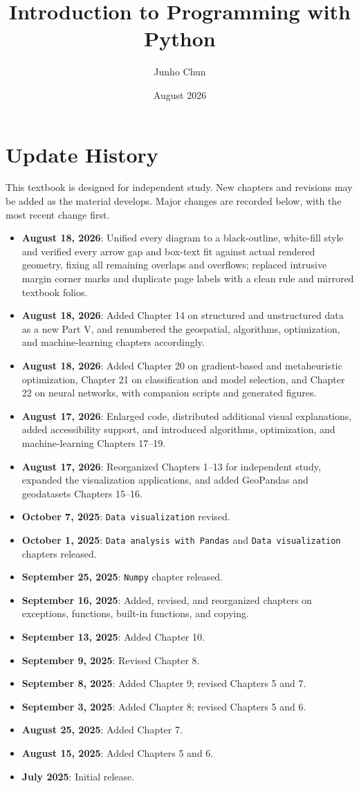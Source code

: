 \documentclass{textbook}
\title{Introduction to Programming with Python}
\author{Junho Chun}
\date{August 2026}
\begin{document}


\section{Update History}
This textbook is designed for independent study. New chapters and revisions
may be added as the material develops. Major changes are recorded below, with
the most recent change first.

\begin{itemize}
\item[] \textbf{August 18, 2026}: Unified every diagram to a black-outline, white-fill style and verified every arrow gap and box-text fit against actual rendered geometry, fixing all remaining overlaps and overflows; replaced intrusive margin corner marks and duplicate page labels with a clean rule and mirrored textbook folios.
\item[] \textbf{August 18, 2026}: Added Chapter 14 on structured and unstructured data as a new Part V, and renumbered the geospatial, algorithms, optimization, and machine-learning chapters accordingly.
\item[] \textbf{August 18, 2026}: Added Chapter 20 on gradient-based and metaheuristic optimization, Chapter 21 on classification and model selection, and Chapter 22 on neural networks, with companion scripts and generated figures.
\item[] \textbf{August 17, 2026}: Enlarged code, distributed additional visual explanations, added accessibility support, and introduced algorithms, optimization, and machine-learning Chapters 17--19.
\item[] \textbf{August 17, 2026}: Reorganized Chapters 1--13 for independent study, expanded the visualization applications, and added GeoPandas and geodatasets Chapters 15--16.
\item[] \textbf{October 7, 2025}: \texttt{Data visualization} revised.
\item[] \textbf{October 1, 2025}: \texttt{Data analysis with Pandas} and \texttt{Data visualization} chapters released.
\item[] \textbf{September 25, 2025}: \texttt{Numpy} chapter released.
\item[] \textbf{September 16, 2025}: Added, revised, and reorganized chapters on exceptions, functions, built-in functions, and copying.
\item[] \textbf{September 13, 2025}: Added Chapter 10.
\item[] \textbf{September 9, 2025}: Revised Chapter 8.
\item[] \textbf{September 8, 2025}: Added Chapter 9; revised Chapters 5 and 7.
\item[] \textbf{September 3, 2025}: Added Chapter 8; revised Chapters 5 and 6.
\item[] \textbf{August 25, 2025}: Added Chapter 7.
\item[] \textbf{August 15, 2025}: Added Chapters 5 and 6.
\item[] \textbf{July 2025}: Initial release.
\end{itemize}
\newpage
\end{document}
